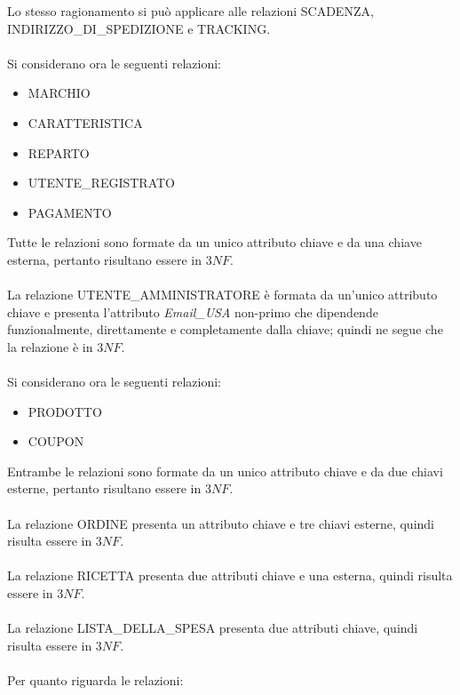 Lo stesso ragionamento si può applicare alle relazioni SCADENZA, INDIRIZZO\_DI\_SPEDIZIONE e TRACKING. \\
\\
Si considerano ora le seguenti relazioni:
\begin{itemize}
	
	\item
	MARCHIO
	
	\item
	CARATTERISTICA
	
	\item
	REPARTO
	
	\item
	UTENTE\_REGISTRATO
	
	\item
	PAGAMENTO
	
\end{itemize}
Tutte le relazioni sono formate da un unico attributo chiave e da una chiave esterna, pertanto risultano essere in $3NF$.\\
\\
La relazione UTENTE\_AMMINISTRATORE è formata da un'unico attributo chiave e presenta l'attributo \emph{Email\_USA} non-primo che dipendende funzionalmente, direttamente e completamente dalla chiave;
quindi ne segue che la relazione è in $3NF$.\\
\\
Si considerano ora le seguenti relazioni:
\begin{itemize}
	
	\item
	PRODOTTO
	
	\item
	COUPON
	
\end{itemize}
Entrambe le relazioni sono formate da un unico attributo chiave e da due chiavi esterne, pertanto risultano essere in $3NF$. \\
\\
La relazione ORDINE presenta un attributo chiave e tre chiavi esterne, quindi risulta essere in $3NF$. \\
\\
La relazione RICETTA presenta due attributi chiave e una esterna, quindi risulta essere in $3NF$. \\
\\
La relazione LISTA\_DELLA\_SPESA presenta due attributi chiave, quindi risulta essere in $3NF$. \\
\\
Per quanto riguarda le relazioni:
